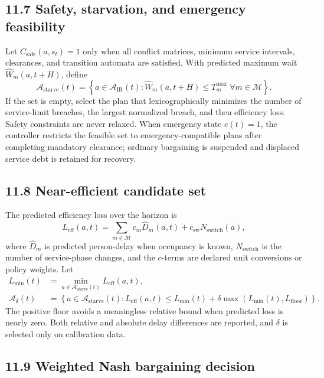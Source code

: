 \documentclass[
  english,
  11pt,
  a4paper,
]{article}
\begin{document}
\subsection{11.7 Safety, starvation, and emergency feasibility}\label{safety-starvation-and-emergency-feasibility}

Let \(C_{\mathrm{safe}}(a,s_t)=1\) only when all conflict matrices,
minimum service intervals, clearances, and transition automata are
satisfied. With predicted maximum wait \(\widehat W_m(a,t+H)\), define
\[
  \mathcal{A}_{\mathrm{starve}}(t)=
  \left\{a\in\mathcal{A}_{\mathrm{IR}}(t):
  \widehat W_m(a,t+H)\le T_m^{\max}\;\forall m\in\mathcal{M}\right\}.
\]
If the set is empty, select the plan that lexicographically minimizes
the number of service-limit breaches, the largest normalized breach,
and then efficiency loss. Safety constraints are never relaxed. When
emergency state \(e(t)=1\), the controller restricts the feasible set
to emergency-compatible plans after completing mandatory clearance;
ordinary bargaining is suspended and displaced service debt is retained
for recovery.

\subsection{11.8 Near-efficient candidate set}\label{near-efficient-candidate-set}

The predicted efficiency loss over the horizon is
\[
  L_{\mathrm{eff}}(a,t)=
  \sum_{m\in\mathcal{M}}c_m\widehat D_m(a,t)
  +c_{\mathrm{sw}}N_{\mathrm{switch}}(a),
\]
where \(\widehat D_m\) is predicted person-delay when occupancy is
known, \(N_{\mathrm{switch}}\) is the number of service-phase changes,
and the \(c\)-terms are declared unit conversions or policy weights.
Let
\begin{align}
  L_{\min}(t) &= \min_{a\in\mathcal{A}_{\mathrm{starve}}(t)}
    L_{\mathrm{eff}}(a,t),\\
  \mathcal{A}_{\delta}(t) &=
    \left\{a\in\mathcal{A}_{\mathrm{starve}}(t):
    L_{\mathrm{eff}}(a,t)\le L_{\min}(t)
    +\delta\max\!\left(L_{\min}(t),L_{\mathrm{floor}}\right)\right\}.
\end{align}
The positive floor avoids a meaningless relative bound when predicted
loss is nearly zero. Both relative and absolute delay differences are
reported, and \(\delta\) is selected only on calibration data.

\subsection{11.9 Weighted Nash bargaining decision}\label{weighted-nash-bargaining-decision}
\end{document}
